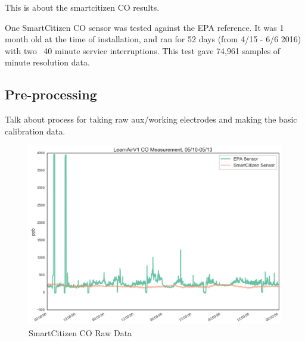 This is about the smartcitizen CO results.

One SmartCitizen CO sensor was tested against the EPA reference.  It was 1 month old at the time of installation, and ran for 52 days (from 4/15 - 6/6 2016) with two ~40 minute service interruptions.  This test gave 74,961 samples of minute resolution data.


\subsection{Pre-processing}

Talk about process for taking raw aux/working electrodes and making the basic calibration data.


\begin{figure}[htb]
 	\includegraphics[width=\textwidth]{figs/co_sck_zoomed}               
 	 \caption{SmartCitizen CO Raw Data}
  	\label{fig:sck_co_raw_zoomed}
\end{figure}


